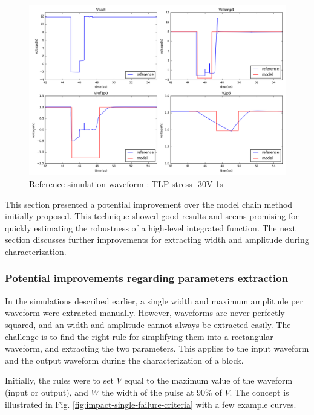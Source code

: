\begin{figure}[!h]
  \centering
  \includegraphics[width=\textwidth]{src/4/figures/total_simulation_30V_1u_V2.png}
  \caption{Reference simulation waveform : TLP stress -30V 1\textmugreek{}s }
  \label{fig:reference_simu_v2}
\end{figure}

This section presented a potential improvement over the model chain method initially proposed.
This technique showed good results and seems promising for quickly estimating the robustness of a high-level integrated function.
The next section discusses further improvements for extracting width and amplitude during characterization.

\subsubsection{Potential improvements regarding parameters extraction}

In the simulations described earlier, a single width and maximum amplitude per waveform were extracted manually.
However, waveforms are never perfectly squared, and an width and amplitude cannot always be extracted easily.
The challenge is to find the right rule for simplifying them into a rectangular waveform, and extracting the two parameters.
This applies to the input waveform and the output waveform during the characterization of a block.

Initially, the rules were to set $V$ equal to the maximum value of the waveform (input or output), and $W$ the width of the pulse at 90\% of $V$.
The concept is illustrated in Fig. \ref{fig:impact-single-failure-criteria} with a few example curves.

